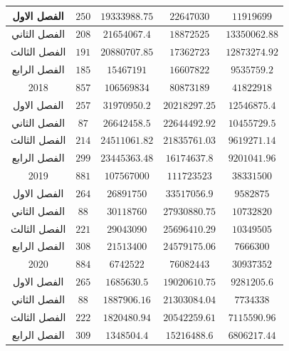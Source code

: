 \documentclass[10pt,a4paper]{report}
\begin{document}
\begin{longtable}{|c|c|c|c|c|}
الفصل الاول  & $250$            & $19333988.75$    & $22647030$     & $11919699$         \\ \hline
الفصل الثاني & $208$            & $21654067.4$     & $18872525$     & $13350062.88$      \\ \hline
الفصل الثالث & $191$            & $20880707.85$    & $17362723$     & $12873274.92$      \\ \hline
الفصل الرابع & $185$            & $15467191$       & $16607822$     & $9535759.2$        \\ \hline
2018         & $857$            & $106569834$      & $80873189$     & $41822918$         \\ \hline
الفصل الاول  & $257$            & $31970950.2$     & $20218297.25$  & $12546875.4$       \\ \hline
الفصل الثاني & $87$             & $26642458.5$     & $22644492.92$  & $10455729.5$       \\ \hline
الفصل الثالث & $214$            & $24511061.82$    & $21835761.03$  & $9619271.14$       \\ \hline
الفصل الرابع & $299$            & $23445363.48$    & $16174637.8$   & $9201041.96$       \\ \hline
2019         & $881$            & $107567000$      & $111723523$    & $38331500$         \\ \hline
الفصل الاول  & $264$            & $26891750$       & $33517056.9$   & $9582875$          \\ \hline
الفصل الثاني & $88$             & $30118760$       & $27930880.75$  & $10732820$         \\ \hline
الفصل الثالث & $221$            & $29043090$       & $25696410.29$  & $10349505$         \\ \hline
الفصل الرابع & $308$            & $21513400$       & $24579175.06$  & $7666300$          \\ \hline
2020         & $884$            & $6742522$        & $76082443$     & $30937352$         \\ \hline
الفصل الاول  & $265$            & $1685630.5$      & $19020610.75$  & $9281205.6$        \\ \hline
الفصل الثاني & $88$             & $1887906.16$     & $21303084.04$  & $7734338$          \\ \hline
الفصل الثالث & $222$            & $1820480.94$     & $20542259.61$  & $7115590.96$       \\ \hline
الفصل الرابع & $309$            & $1348504.4$      & $15216488.6$   & $6806217.44$       \\ \hline

\end{longtable}
\end{document}
